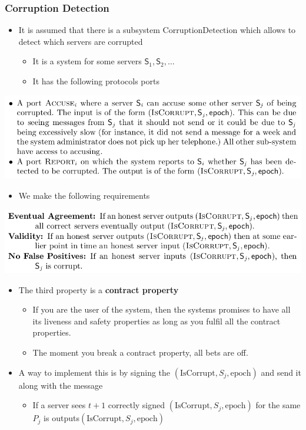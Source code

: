 \documentclass[11pt]{article}
\begin{document}
\subsubsection{Corruption Detection}
\label{sec:org409ff91}
\begin{itemize}
\item It is assumed that there is a subsystem \(\text{CorruptionDetection}\) which allows to detect which servers are corrupted
\begin{itemize}
\item It is a system for some servers \(\mathsf S_1, \mathsf S_2, \dots\)
\item It has the following protocols ports
\end{itemize}
\end{itemize}
\begin{center}
\includegraphics[width=.9\linewidth]{State Machine Replication (10)/screenshot_2018-10-21_12-00-13.png}
\end{center}
\begin{itemize}
\item We make the following requirements
\end{itemize}
\begin{center}
\includegraphics[width=.9\linewidth]{State Machine Replication (10)/screenshot_2018-10-21_12-00-31.png}
\end{center}

\begin{itemize}
\item The third property is a \textbf{contract property} 
\begin{itemize}
\item If you are the user of the system, then the systems promises to have all its liveness and safety properties as long as you fulfil all the contract properties.
\item The moment you break a contract property, all bets are off.
\end{itemize}

\item A way to implement this is by signing the \((\text{IsCorrupt}, S_j , \text{epoch})\) and send it along with the message
\begin{itemize}
\item If a server sees \(t+1\) correctly signed \((\text{IsCorrupt}, S_j , \text{epoch})\) for the same \(P_j\) is outputs\((\text{IsCorrupt}, S_j , \text{epoch})\)
\end{itemize}
\end{itemize}
\end{document}
